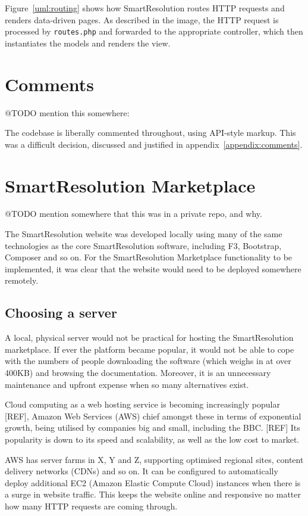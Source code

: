 Figure~\ref{uml:routing} shows how SmartResolution routes HTTP requests and renders data-driven pages. As described in the image, the HTTP request is processed by \lstinline{routes.php} and forwarded to the appropriate controller, which then instantiates the models and renders the view.

\section{Comments}

@TODO mention this somewhere:

The codebase is liberally commented throughout, using API-style markup. This was a difficult decision, discussed and justified in appendix~\ref{appendix:comments}.

\section{SmartResolution Marketplace}

@TODO mention somewhere that this was in a private repo, and why.

The SmartResolution website was developed locally using many of the same technologies as the core SmartResolution software, including F3, Bootstrap, Composer and so on. For the SmartResolution Marketplace functionality to be implemented, it was clear that the website would need to be deployed somewhere remotely.

\subsection{Choosing a server}

A local, physical server would not be practical for hosting the SmartResolution marketplace. If ever the platform became popular, it would not be able to cope with the numbers of people downloading the software (which weighs in at over 400KB) and browsing the documentation. Moreover, it is an unnecessary maintenance and upfront expense when so many alternatives exist.

Cloud computing as a web hosting service is becoming increasingly popular [REF], Amazon Web Services (AWS) chief amongst these in terms of exponential growth, being utilised by companies big and small, including the BBC. [REF] Its popularity is down to its speed and scalability, as well as the low cost to market.

AWS has server farms in X, Y and Z, supporting optimised regional sites, content delivery networks (CDNs) and so on. It can be configured to automatically deploy additional EC2 (Amazon Elastic Compute Cloud) instances when there is a surge in website traffic. This keeps the website online and responsive no matter how many HTTP requests are coming through.

